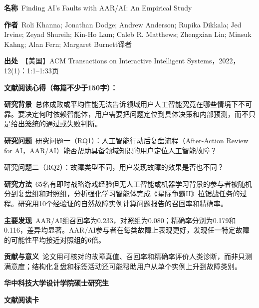 \noindent\underline{}\par
\vspace{0.35em}
\noindent\textbf{名称}\ Finding AI's Faults with AAR/AI: An Empirical Study\par
\noindent\textbf{作者}\ Roli Khanna; Jonathan Dodge; Andrew Anderson; Rupika Dikkala; Jed Irvine; Zeyad Shureih; Kin-Ho Lam; Caleb R. Matthews; Zhengxian Lin; Minsuk Kahng; Alan Fern; Margaret Burnett\quad 译者\par
\noindent\textbf{出处}\ 【美国】ACM Transactions on Interactive Intelligent Systems，2022，12(1)：1:1–1:33\quad 页\par
\vspace{0.35em}
\noindent\textbf{文献阅读心得（每篇不少于150字）：}\par
\noindent\textbf{研究背景}\ 总体成败或平均性能无法告诉领域用户人工智能究竟在哪些情境下不可靠。要决定何时依赖智能体，用户需要把问题定位到具体决策和内部预测，而不只是给出笼统的通过或失败判断。\par
\noindent\textbf{研究问题}\ 研究问题一（RQ1）：人工智能行动后复盘流程（After-Action Review for AI，AAR/AI）能否帮助具备领域知识的用户定位人工智能故障？\par
研究问题二（RQ2）：故障类型不同，用户发现故障的效果是否也不同？\par
\noindent\textbf{研究方法}\ 65名有即时战略游戏经验但无人工智能或机器学习背景的参与者被随机分到复盘组和对照组，分析强化学习智能体完成《星际争霸II》拉锯战任务的过程。研究用10个经验证的自然故障实例计算问题报告的召回率和精确率。\par
\noindent\textbf{主要发现}\ AAR/AI组召回率为0.233，对照组为0.080；精确率分别为0.179和0.116，差异均显著。AAR/AI参与者在每类故障上表现更好，发现任一特定故障的可能性平均接近对照组的6倍。\par
\noindent\textbf{贡献与意义}\ 论文用可核对的故障真值、召回率和精确率评价人类诊断，而非只测满意度；结构化复盘和标签活动还可能帮助用户从单个实例上升到故障类别。\par
\clearpage
\begin{center}
{\songti\bfseries\fontsize{18.5pt}{27.75pt}\selectfont 华中科技大学设计学院硕士研究生\par}
{\songti\bfseries\fontsize{18.5pt}{27.75pt}\selectfont 文献阅读卡\par}
\end{center}
\vspace{0.25em}
\noindent\underline{}\par
